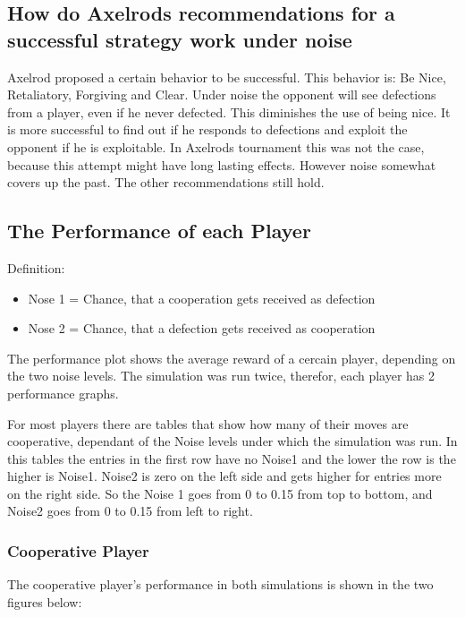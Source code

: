 \documentclass[11pt,twoside]{article}
\begin{document}
\subsection{How do Axelrods recommendations for a successful strategy work under noise}
Axelrod proposed a certain behavior to be successful. This behavior is: Be Nice, Retaliatory, Forgiving and  Clear.  Under noise the opponent will see defections from a player, even if he never defected. This diminishes the use of being nice. It is more successful to find out if he responds to defections and exploit the opponent if he is exploitable. In Axelrods tournament this was not the case, because this attempt might have long lasting effects. However noise somewhat covers up the past. The other recommendations still hold.

\subsection{The Performance of each Player}
Definition:
\begin{itemize}
	\item Nose 1 = Chance, that a cooperation gets received as defection
	\item Nose 2 = Chance, that a defection gets received as cooperation
\end{itemize}
The performance plot shows the average reward of a cercain player, depending on the two noise levels. The simulation was run twice, therefor, each player has 2 performance graphs.

For most players there are tables that show how many of their moves are cooperative, dependant of the Noise levels under which the simulation was run. In this tables the entries in the first row have no Noise1 and the lower the row is the higher is Noise1. Noise2 is zero on the left side and gets higher for entries more on the right side. So the Noise 1 goes from 0 to 0.15 from top to bottom, and Noise2 goes from 0 to 0.15 from left to right.

\newpage
\subsubsection{Cooperative Player}

The cooperative player's performance in both simulations is shown in the two figures below:
\end{document}
